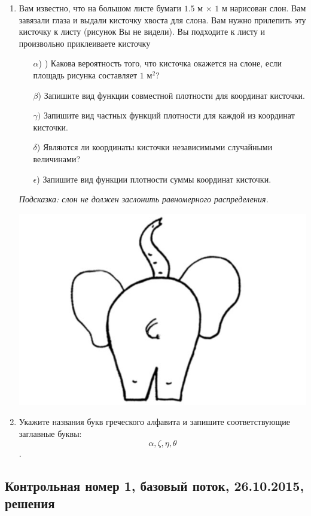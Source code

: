 \documentclass[12pt, a4paper]{article}\usepackage[]{graphicx}\usepackage[]{color}
\begin{document}
\begin{enumerate}
\item
Вам известно, что на большом листе бумаги $1.5$ м $\times$ $1$ м нарисован слон. Вам завязали
глаза и выдали кисточку хвоста для слона. Вам нужно прилепить эту кисточку к
листу (рисунок Вы не видели). Вы подходите к листу и произвольно приклеиваете
кисточку
\begin{enumerate}
    \item[$\alpha$)] ) Какова вероятность того, что кисточка окажется на слоне, если площадь рисунка составляет $1$ м$^2$?
    \item[$\beta$)]  Запишите вид функции совместной плотности для координат кисточки.
    \item[$\gamma)$] Запишите вид частных функций плотности для каждой из координат кисточки.
    \item[$\delta$)] Являются ли координаты кисточки независимыми случайными величинами?
    \item[$\epsilon$)] Запишите вид функции плотности суммы координат кисточки.
\end{enumerate}
\textit{Подсказка: слон не должен заслонить равномерного распределения.}

\begin{center}
\includegraphics[scale=1.5]{images/slon.jpg}
\end{center}

\item
Укажите названия букв греческого алфавита и запишите соответствующие заглавные буквы:
\[\alpha, \zeta, \eta, \theta\].

\end{enumerate}

\subsection{Контрольная номер 1, базовый поток, 26.10.2015, решения}
\end{document}
